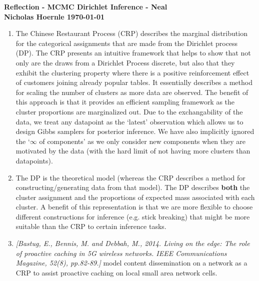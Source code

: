 \documentclass[twoside]{article}
\begin{document}
\textbf{Reflection - MCMC Dirichlet Inference - Neal}\\
\textbf{Nicholas Hoernle \hfill \today}

\begin{enumerate}
  \item The Chinese Restaurant Process (CRP) describes the marginal distribution for the categorical assignments that are made from the Dirichlet process (DP). The CRP presents an intuitive framework that helps to show that not only are the draws from a Dirichlet Process discrete, but also that they exhibit the clustering property where there is a positive reinforcement effect of customers joining already popular tables. It essentially describes a method for scaling the number of clusters as more data are observed. The benefit of this approach is that it provides an efficient sampling framework as the cluster proportions are marginalized out. Due to the exchangability of the data, we treat any datapoint as the `latest' observation which allows us to design Gibbs samplers for posterior inference. We have also implicitly ignored the `$\infty$ of components' as we only consider new components when they are motivated by the data (with the hard limit of not having more clusters than datapoints).
  \item The DP is the theoretical model (whereas the CRP describes a method for constructing/generating data from that model). The DP describes \textbf{both} the cluster assignment and the proportions of expected mass associated with each cluster. A benefit of this representation is that we are more flexible to choose different constructions for inference (e.g. stick breaking) that might be more suitable than the CRP to certain inference tasks.
  \item \textit{[Bastug, E., Bennis, M. and Debbah, M., 2014. Living on the edge: The role of proactive caching in 5G wireless networks. IEEE Communications Magazine, 52(8), pp.82-89.]} model content dissemination on a network as a CRP to assist proactive caching on local small area network cells.
\end{enumerate}

% 
\end{document}
